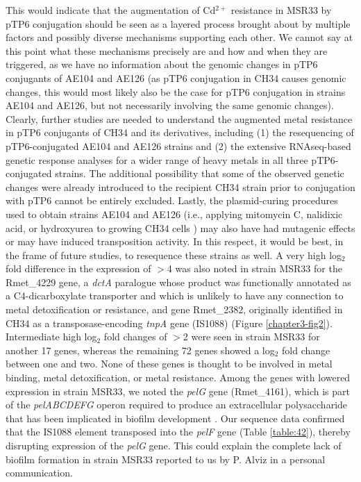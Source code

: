 This would indicate that the augmentation of Cd$^{2+}$ resistance in MSR33 by pTP6 conjugation should be seen as a layered process brought about by multiple factors and possibly diverse mechanisms supporting each other. We cannot say at this point what these mechanisms precisely are and how and when they are triggered, as we have no information about the genomic changes in pTP6 conjugants of AE104 and AE126 (as pTP6 conjugation in CH34 causes genomic changes, this would most likely also be the case for pTP6 conjugation in strains AE104 and AE126, but not necessarily involving the same genomic changes). Clearly, further studies are needed to understand the augmented metal resistance in pTP6 conjugants of CH34 and its derivatives, including (1) the resequencing of pTP6-conjugated AE104 and AE126 strains and (2) the extensive RNAseq-based genetic response analyses for a wider range of heavy metals in all three pTP6-conjugated strains. The additional possibility that some of the observed genetic changes were already introduced to the recipient CH34 strain prior to conjugation with pTP6 cannot be entirely excluded. Lastly, the plasmid-curing procedures used to obtain strains AE104 and AE126 (i.e., applying mitomycin C, nalidixic acid, or hydroxyurea to growing CH34 cells \citep{mergeay1985alcaligenes}) may also have had mutagenic effects or may have induced transposition activity. In this respect, it would be best, in the frame of future studies, to resequence these strains as well.
A very high log$_2$ fold difference in the expression of $>$4 was also noted in strain MSR33 for the Rmet\_4229 gene, a \textit{dctA} paralogue whose product was functionally annotated as a C4-dicarboxylate transporter and which is unlikely to have any connection to metal detoxification or resistance, and gene Rmet\_2382, originally identified in CH34 as a transposase-encoding \textit{tnpA} gene (IS1088) (Figure \ref{chapter3-fig2}). Intermediate high log$_2$ fold changes of $>$2 were seen in strain MSR33 for another 17 genes, whereas the remaining 72 genes showed a log$_2$ fold change between one and two. None of these genes is thought to be involved in metal binding, metal detoxification, or metal resistance. Among the genes with lowered expression in strain MSR33, we noted the \textit{pelG} gene (Rmet\_4161), which is part of the \textit{pelABCDEFG} operon required to produce an extracellular polysaccharide that has been implicated in biofilm development \citep{vasseur2005pel}. Our sequence data confirmed that the IS1088 element transposed into the \textit{pelF} gene (Table \ref{table:42}), thereby disrupting expression of the \textit{pelG} gene. This could explain the complete lack of biofilm formation in strain MSR33 reported to us by P. Alviz in a personal communication.
